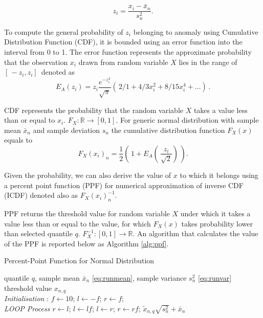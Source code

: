 \begin{equation}
z_i = \frac{x_i - \bar x_n}{s^2_n}\text{.}\label{eq:zscore}
\end{equation}


To compute the general probability of $z_i$ belonging to anomaly using Cumulative Distribution Function (CDF), it is bounded using an error function into the interval from 0 to 1. The error function represents the approximate probability that the observation \(x_i\) drawn from random variable \(X\) lies in the range of \([\,-z_i,z_i]\,\) denoted as
\begin{equation}
E_A (z_i) = z_i\frac{e^{-z^2_i}}{\sqrt{\pi}}( \,2/1 + 4/3x^2_i + 8/15 x^4_i + ...) \,\text{.}\label{eq:erf}
\end{equation}

CDF represents the probability that the random variable \(X\) takes a value less than or equal to \(x_i\). \(F_X\colon \mathbb{R} \to [0,1]\). For generic normal distribution with sample mean \(\bar x_n\) and sample deviation \(s_n\) the cumulative distribution function \(F_X(x)\) equals to
\begin{equation}
F_X(x_i)_n = \frac{1}{2}( \,1+E_A(\,\frac{z_i}{\sqrt{2}})\,) \text{.}\label{eq:cdf}
\end{equation}

Given the probability, we can also derive the value of \(x\) to which it belongs using a percent point function (PPF) for numerical approximation of inverse CDF (ICDF) denoted also as $F_X(x_i)^{-1}_n$.

PPF returns the threshold value for random variable \(X\) under which it takes a value less than or equal to the value, for which \(F_X(x)\) takes probability lower than selected quantile \(q\). \(F_X^{-1}\colon [0, 1] \to \mathbb{R}\). An algorithm that calculates the value of the PPF is reported below as Algorithm \ref{alg:ppf}.

\begin{algorithm}[H]
\caption{{Percent-Point Function for Normal Distribution}} \label{alg:ppf}
 \begin{algorithmic}[1]
 \renewcommand{\algorithmicrequire}{\textbf{Input:}}
 \renewcommand{\algorithmicensure}{\textbf{Output:}}
 \REQUIRE quantile $q$, sample mean $\bar x_n$ \eqref{eq:runmean}, sample variance $s^2_n$ \eqref{eq:runvar}
 \ENSURE  threshold value $x_{n,q}$
 \\ \textit{Initialisation} : 
  \STATE $f \leftarrow 10$; $l \leftarrow -f $; $r \leftarrow f;$
 \\ \textit{LOOP Process}
  \STATE $r \leftarrow l $;
  \STATE $l \leftarrow lf $;
  \ENDWHILE
    \STATE $l \leftarrow r $;
    \STATE $r \leftarrow rf $;
  \ENDWHILE
 \RETURN $\tilde{x}_{n,q}  \sqrt{s^2_n} + \bar x_n $
 \end{algorithmic}
\end{algorithm}


